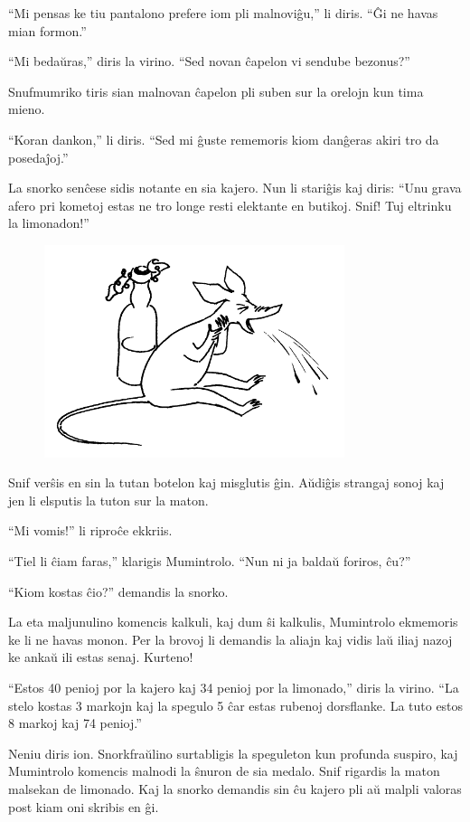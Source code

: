 ``Mi pensas ke tiu pantalono prefere iom pli malnoviĝu,'' li diris. ``Ĝi ne havas mian formon.''

``Mi bedaŭras,'' diris la virino. ``Sed novan ĉapelon vi sendube bezonus?''

Snufmumriko tiris sian malnovan ĉapelon pli suben sur la orelojn kun tima mieno.

``Koran dankon,'' li diris. ``Sed mi ĝuste rememoris kiom danĝeras akiri tro da posedaĵoj.''

La snorko senĉese sidis notante en sia kajero. Nun li stariĝis kaj diris: ``Unu grava afero pri kometoj estas ne tro longe resti elektante en butikoj. Snif! Tuj eltrinku la limonadon!''

\begin{figure}[htbp]
\centering
\includegraphics[width=249pt,height=176pt]{6-5.png}
\caption{}
\label{6-5}
\end{figure}

Snif verŝis en sin la tutan botelon kaj misglutis ĝin. Aŭdiĝis strangaj sonoj kaj jen li elsputis la tuton sur la maton.

``Mi vomis!'' li riproĉe ekkriis.

``Tiel li ĉiam faras,'' klarigis Mumintrolo. ``Nun ni ja baldaŭ foriros, ĉu?''

``Kiom kostas ĉio?'' demandis la snorko.

La eta maljunulino komencis kalkuli, kaj dum ŝi kalkulis, Mumintrolo ekmemoris ke li ne havas monon. Per la brovoj li demandis la aliajn kaj vidis laŭ iliaj nazoj ke ankaŭ ili estas senaj. Kurteno!

``Estos 40 penioj por la kajero kaj 34 penioj por la limonado,'' diris la virino. ``La stelo kostas 3 markojn kaj la spegulo 5 ĉar estas rubenoj dorsflanke. La tuto estos 8 markoj kaj 74 penioj.''

Neniu diris ion. Snorkfraŭlino surtabligis la speguleton kun profunda suspiro, kaj Mumintrolo komencis malnodi la ŝnuron de sia medalo. Snif rigardis la maton malsekan de limonado. Kaj la snorko demandis sin ĉu kajero pli aŭ malpli valoras post kiam oni skribis en ĝi.

